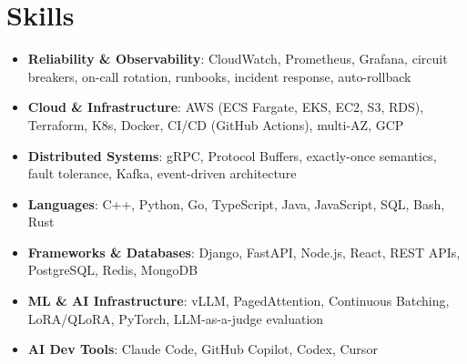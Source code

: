 \documentclass[letterpaper,11pt]{article}
\newcommand{\resumeSubHeadingListStart}{\begin{itemize}[leftmargin=0.15in, label={}]}
\newcommand{\resumeSubHeadingListEnd}{\end{itemize}}
\newcommand{\resumeSkillHeading}[2]{%
  \item\small{\textbf{#1}: #2 \vspace{-9pt}}%
}
\begin{document}
\section{Skills}
  \resumeSubHeadingListStart
    \resumeSkillHeading{Reliability \& Observability}{CloudWatch, Prometheus, Grafana, circuit breakers, on-call rotation, runbooks, incident response, auto-rollback}
    \resumeSkillHeading{Cloud \& Infrastructure}{AWS (ECS Fargate, EKS, EC2, S3, RDS), Terraform, K8s, Docker, CI/CD (GitHub Actions), multi-AZ, GCP}
    \resumeSkillHeading{Distributed Systems}{gRPC, Protocol Buffers, exactly-once semantics, fault tolerance, Kafka, event-driven architecture}
    \resumeSkillHeading{Languages}{C++, Python, Go, TypeScript, Java, JavaScript, SQL, Bash, Rust}
    \resumeSkillHeading{Frameworks \& Databases}{Django, FastAPI, Node.js, React, REST APIs, PostgreSQL, Redis, MongoDB}
    \resumeSkillHeading{ML \& AI Infrastructure}{vLLM, PagedAttention, Continuous Batching, LoRA/QLoRA, PyTorch, LLM-as-a-judge evaluation}
    \resumeSkillHeading{AI Dev Tools}{Claude Code, GitHub Copilot, Codex, Cursor}
  \resumeSubHeadingListEnd
\end{document}
